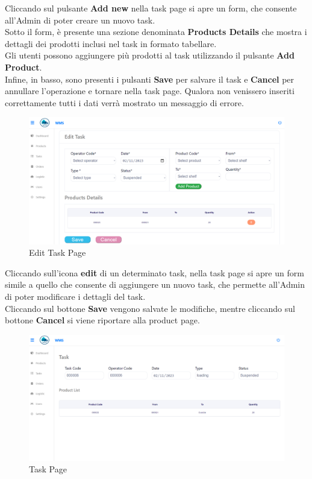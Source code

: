 Cliccando sul pulsante \textbf{Add new} nella task page si apre un form, che consente
all'Admin di poter creare un nuovo task.\\
Sotto il form, è presente una sezione denominata \textbf{Products Details} che mostra i dettagli dei prodotti inclusi
nel task in formato tabellare.\\Gli utenti possono aggiungere più prodotti al task utilizzando il pulsante \textbf{Add Product}.\\
Infine, in basso, sono presenti i pulsanti \textbf{Save} per salvare il task e \textbf{Cancel} per annullare l'operazione
e tornare nella task page.
Qualora non venissero inseriti correttamente tutti i dati verrà mostrato un messaggio di errore.

\begin{figure}[H]
    \centering
    \includegraphics[width=\textwidth]{document/sections/img/Storyboard/editTaskPage.png}
    \caption{Edit Task Page}
    \label{fig:editTaskPage}
\end{figure}

Cliccando sull'icona \textbf{edit} di un determinato task, nella task page si apre un form simile a quello che
consente di aggiungere un nuovo task, che permette all'Admin di poter modificare i dettagli del task.\\
Cliccando sul bottone \textbf{Save} vengono salvate le modifiche, mentre cliccando sul bottone \textbf{Cancel} si viene
riportare alla product page.

\begin{figure}[H]
    \centering
    \includegraphics[width=\textwidth]{document/sections/img/Storyboard/viewTask.png}
    \caption{Task Page}
    \label{fig:viewTasksPage}
\end{figure}

